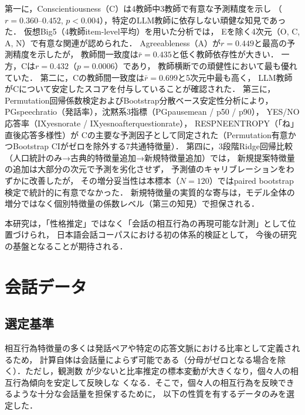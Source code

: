\documentclass[dvipdfmx,11pt,a4paper]{bxjsarticle}
\renewcommand{\_}{\paperorigunderscore\allowbreak}%
\begin{document}
第一に，Conscientiousness（C）は4教師中3教師で有意な予測精度を示し
（$r = 0.360$--$0.452$, $p < 0.004$），特定のLLM教師に依存しない頑健な知見であった．
仮想Big5（4教師item-level平均）を用いた分析では，
Eを除く4次元（O, C, A, N）で有意な関連が認められた．
Agreeableness（A）が$r = 0.449$と最高の予測精度を示したが，
教師間一致度は$\bar{r} = 0.435$と低く教師依存性が大きい．
一方，Cは$r = 0.432$（$p = 0.0006$）であり，
教師横断での頑健性において最も優れていた．
第二に，Cの教師間一致度は$\bar{r} = 0.699$と5次元中最も高く，
LLM教師がCについて安定したスコアを付与していることが確認された．
第三に，Permutation回帰係数検定およびBootstrap分散ベース安定性分析により，
PG\_speech\_ratio（発話率），沈黙系3指標（PG\_pause\_mean / p50 / p90），
YES/NO応答率（IX\_yesno\_rate / IX\_yesno\_after\_question\_rate），
RESP\_NE\_ENTROPY（「ね」直後応答多様性）が
Cの主要な予測因子として同定された（Permutation有意かつBootstrap CIがゼロを除外する7共通特徴量）．
第四に，3段階Ridge回帰比較（人口統計のみ→古典的特徴量追加→新規特徴量追加）では，
新規提案特徴量の追加は大部分の次元で予測を劣化させず，
予測値のキャリブレーションをわずかに改善したが，
その増分妥当性は本標本（$N = 120$）ではpaired bootstrap検定で統計的に有意でなかった．
新規特徴量の実質的な寄与は，モデル全体の増分ではなく個別特徴量の係数レベル（第三の知見）で担保される．

本研究は，「性格推定」ではなく「会話の相互行為の再現可能な計測」として位置づけられ，
日本語会話コーパスにおける初の体系的検証として，
今後の研究の基盤となることが期待される．


\clearpage


\appendix


\section{会話データ}
\label{sec:supp_dataset}

\subsection{選定基準}
相互行為特徴量の多くは発話ペアや特定の応答文脈における比率として定義されるため，
計算自体は会話量によらず可能である（分母がゼロとなる場合を除く）．ただし，観測数
が少ないと比率推定の標本変動が大きくなり，個々人の相互行為傾向を安定して反映しな
くなる．そこで，個々人の相互行為を反映できるような十分な会話量を担保するために，
以下の性質を有するデータのみを選定した．
\end{document}
